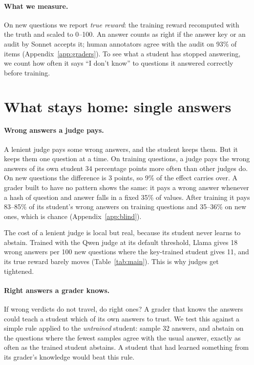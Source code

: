 \documentclass[11pt,a4paper,twocolumn]{article}
\newcommand{\idk}{``I don't know''}
\begin{document}
\paragraph{What we measure.} On new questions we report \emph{true reward}: the training reward recomputed with the truth and scaled to 0--100. An answer counts as right if the answer key or an audit by Sonnet accepts it; human annotators agree with the audit on 93\% of items (Appendix~\ref{app:graders}). To see what a student has stopped answering, we count how often it says \idk{} to questions it answered correctly before training.

\section{What stays home: single answers}
\label{sec:home}


\paragraph{Wrong answers a judge pays.} A lenient judge pays some wrong answers, and the student keeps them. But it keeps them one question at a time. On training questions, a judge pays the wrong answers of its own student 34 percentage points more often than other judges do. On new questions the difference is 3 points, so 9\% of the effect carries over. A grader built to have no pattern shows the same: it pays a wrong answer whenever a hash of question and answer falls in a fixed 35\% of values. After training it pays 83--85\% of its student's wrong answers on training questions and 35--36\% on new ones, which is chance (Appendix~\ref{app:blind}).

The cost of a lenient judge is local but real, because its student never learns to abstain. Trained with the Qwen judge at its default threshold, Llama gives 18 wrong answers per 100 new questions where the key-trained student gives 11, and its true reward barely moves (Table~\ref{tab:main}). This is why judges get tightened.

\paragraph{Right answers a grader knows.} If wrong verdicts do not travel, do right ones? A grader that knows the answers could teach a student which of its own answers to trust. We test this against a simple rule applied to the \emph{untrained} student: sample 32 answers, and abstain on the questions where the fewest samples agree with the usual answer, exactly as often as the trained student abstains. A student that had learned something from its grader's knowledge would beat this rule.
\end{document}
